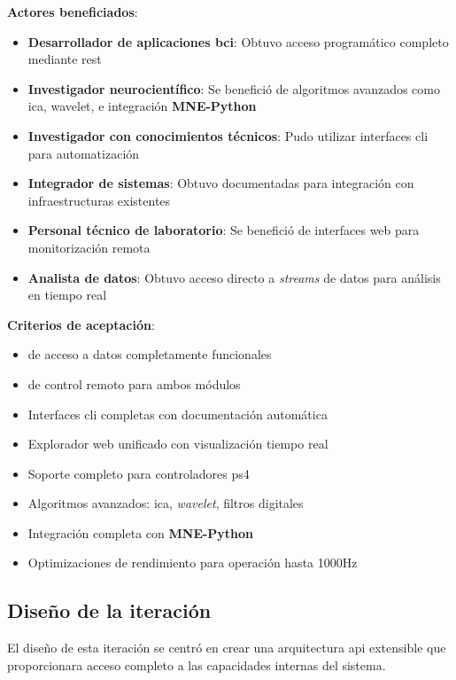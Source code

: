 \textbf{Actores beneficiados}:
\begin{itemize}
    \item \textbf{Desarrollador de aplicaciones \acrshort{bci}}: Obtuvo acceso programático completo mediante  \acrshort{rest}
    \item \textbf{Investigador neurocientífico}: Se benefició de algoritmos avanzados como \acrshort{ica}, \gls{wavelet}, e integración \textbf{MNE-Python}
    \item \textbf{Investigador con conocimientos técnicos}: Pudo utilizar interfaces \acrshort{cli} para automatización
    \item \textbf{Integrador de sistemas}: Obtuvo  documentadas para integración con infraestructuras existentes
    \item \textbf{Personal técnico de laboratorio}: Se benefició de interfaces web para monitorización remota
    \item \textbf{Analista de datos}: Obtuvo acceso directo a \textit{\glspl{stream}} de datos para análisis en tiempo real
\end{itemize}

\textbf{Criterios de aceptación}:
\begin{itemize}
    \item {} de acceso a datos completamente funcionales
    \item {} de control remoto para ambos módulos
    \item Interfaces \acrshort{cli} completas con documentación automática
    \item Explorador web unificado con visualización tiempo real
    \item Soporte completo para controladores \acrshort{ps4}
    \item Algoritmos avanzados: \acrshort{ica}, \textit{\gls{wavelet}}, filtros digitales
    \item Integración completa con \textbf{MNE-Python}
    \item Optimizaciones de rendimiento para operación hasta 1000Hz
\end{itemize}

\subsection{Diseño de la iteración}
\label{subsec:diseno_iteracion_3}

El diseño de esta iteración se centró en crear una arquitectura \acrshort{api} extensible que proporcionara acceso completo a las capacidades internas del sistema.


